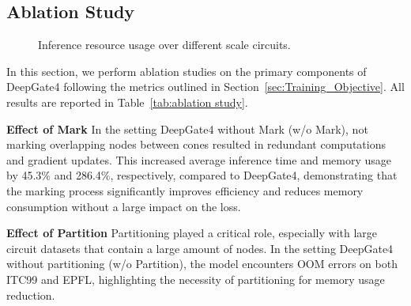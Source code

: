 \subsection{Ablation Study}
\begin{figure}[]
    \vspace{-15pt}
    \centering
    \vspace{-5pt}
    \caption{Inference resource usage over different scale circuits.}
    \vspace{-15pt}
\end{figure}
\vspace{-5pt}
In this section, we perform ablation studies on the primary components of DeepGate4 following the metrics outlined in Section~\ref{sec:Training_Objective}. All results are reported in Table~\ref{tab:ablation study}.

\noindent\textbf{Effect of Mark} 
In the setting DeepGate4 without Mark (w/o Mark), not marking overlapping nodes between cones resulted in redundant computations and gradient updates. This increased average inference time and memory usage by 45.3\% and 286.4\%, respectively, compared to DeepGate4, demonstrating that the marking process significantly improves efficiency and reduces memory consumption without a large impact on the loss.

\noindent\textbf{Effect of Partition}
Partitioning played a critical role, especially with large circuit datasets that contain a large amount of nodes. In the setting DeepGate4 without partitioning (w/o Partition), the model encounters OOM errors on both ITC99 and EPFL, highlighting the necessity of partitioning for memory usage reduction.


